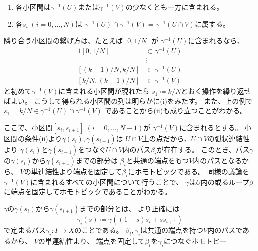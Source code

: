 \documentclass[report]{jlreq}
\begin{document}
\begin{answer}
    \begin{enumerate}[label=(\roman*)]
        \item 各小区間は$\gamma^{-1}(U)$または$\gamma^{-1}(V)$の少なくとも一方に含まれる。
        \item 各$s_i \; (i = 0, \dots, N)$は
            $\gamma^{-1}(U) \cap \gamma^{-1}(V) = \gamma^{-1}(U \cap V)$に属する。
    \end{enumerate}
    \begin{innerproof}
        隣り合う小区間の繋げ方は、たとえば$[0, 1 / N]$が
        $\gamma^{-1}(U)$に含まれるなら、
        \begin{alignat}{1}
            [0, 1 / N] &\subset \gamma^{-1}(U) \\
            &\vdots \\
            [(k - 1) / N, k / N] &\subset \gamma^{-1}(U) \\
            [k / N, (k + 1) / N] &\subset \gamma^{-1}(V)
        \end{alignat}
        と初めて$\gamma^{-1}(V)$に含まれる小区間が現れたら
        $s_1 \coloneqq k / N$とおく操作を繰り返せばよい。
        こうして得られる小区間の列は明らかに(i)をみたす。
        また、上の例で$s_1 = k / N \in \gamma^{-1}(U) \cap \gamma^{-1}(V)$
        であることから(ii)も成り立つことがわかる。
    \end{innerproof}
    ここで、小区間$[s_i, s_{i + 1}] \; (i = 0, \dots, N - 1)$が
    $\gamma^{-1}(V)$に含まれるとする。
    小区間の条件(ii)より$\gamma(s_i), \gamma(s_{i + 1})$は
    $U \cap V$上の点だから、$U \cap V$の弧状連結性より
    $\gamma(s_i)$と$\gamma(s_{i + 1})$をつなぐ$U \cap V$内のパス$\beta_i$が存在する。
    このとき、パス$\gamma$の$\gamma(s_i)$から$\gamma(s_{i + 1})$までの部分は
    $\beta_i$と共通の端点をもつ$V$内のパスとなるから、
    $V$の単連結性より端点を固定して$\beta_i$にホモトピックである。
    同様の議論を$\gamma^{-1}(V)$に含まれるすべての小区間について行うことで、
    $\gamma$は$U$内の或るループ$\beta$に端点を固定してホモトピックであることがわかる。
    \begin{innerproof}
        $\gamma$の$\gamma(s_i)$から$\gamma(s_{i + 1})$までの部分とは、
        より正確には
        \begin{equation}
            \gamma_i(s) \coloneqq \gamma((1 - s) s_i + s s_{i + 1})
        \end{equation}
        で定まるパス$\gamma_i \colon I \to X$のことである。
        $\beta_i, \gamma_i$は共通の端点を持つ$V$内のパスであるから、
        $V$の単連結性より、
        端点を固定して$\beta_i$を$\gamma_i$につなぐホモトピー

\end{innerproof}
\end{answer}
\end{document}
